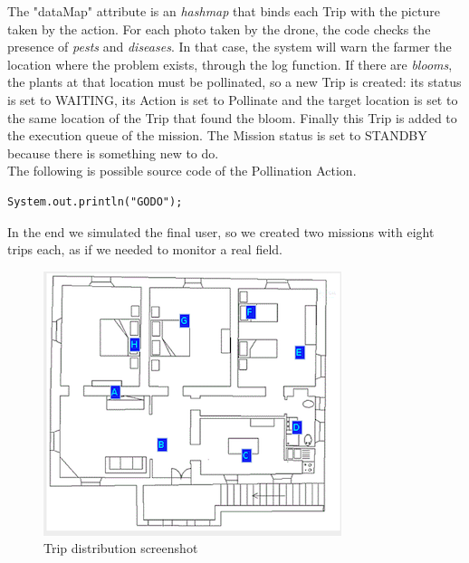The "dataMap" attribute is an \textit{hashmap} that binds each Trip with the picture taken by the action.
For each photo taken by the drone, the code checks the presence of \textit{pests} and \textit{diseases}. In that case, the system will warn the farmer the location where the problem exists, through the log function.
If there are \textit{blooms}, the plants at that location must be pollinated, so a new Trip is created: its status is set to WAITING, its Action is set to Pollinate and the target location is set to the same location of the Trip that found the bloom.
Finally this Trip is added to the execution queue of the mission. The Mission status is set to STANDBY because there is something new to do.
\\

The following is possible source code of the Pollination Action.

\begin{lstlisting}
System.out.println("GODO");
\end{lstlisting}

In the end we simulated the final user, so we created two missions with eight trips each, as if we needed to monitor a real field.

\begin{figure}[H]
  \centering
  \includegraphics[width=\linewidth]{pictures/area3.png}
  \caption{Trip distribution screenshot}
  \label{fig:alfalfaArea}
\end{figure}

